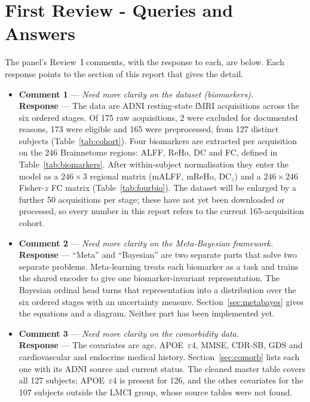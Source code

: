 \documentclass{ssnreview}
\begin{document}
\chapter{First Review - Queries and Answers}

The panel's Review~I comments, with the response to each, are below. Each response points
to the section of this report that gives the detail.

\begin{itemize}
  \item \textbf{Comment 1} --- \emph{Need more clarity on the dataset (biomarkers).}\\
        \textbf{Response} --- The data are ADNI resting-state fMRI acquisitions across the
        six ordered stages. Of 175 raw acquisitions, 2 were excluded for documented
        reasons, 173 were eligible and 165 were preprocessed, from 127 distinct subjects
        (Table~\ref{tab:cohort}). Four biomarkers are extracted per acquisition on the 246
        Brainnetome regions: ALFF, ReHo, DC and FC, defined in
        Table~\ref{tab:biomarkers}. After within-subject normalisation they enter the
        model as a $246\times3$ regional matrix (mALFF, mReHo, DC$_z$) and a
        $246\times246$ Fisher-$z$ FC matrix (Table~\ref{tab:fourbio}). The dataset will be
        enlarged by a further 50 acquisitions per stage; these have not yet been
        downloaded or processed, so every number in this report refers to the current
        165-acquisition cohort.
  \item \textbf{Comment 2} --- \emph{Need more clarity on the Meta-Bayesian framework.}\\
        \textbf{Response} --- ``Meta'' and ``Bayesian'' are two separate parts that solve
        two separate problems. Meta-learning treats each biomarker as a task and trains
        the shared encoder to give one biomarker-invariant representation. The Bayesian
        ordinal head turns that representation into a distribution over the six ordered
        stages with an uncertainty measure. Section~\ref{sec:metabayes} gives the
        equations and a diagram. Neither part has been implemented yet.
  \item \textbf{Comment 3} --- \emph{Need more clarity on the comorbidity data.}\\
        \textbf{Response} --- The covariates are age, APOE~$\varepsilon4$, MMSE, CDR-SB,
        GDS and cardiovascular and endocrine medical history. Section~\ref{sec:comorb}
        lists each one with its ADNI source and current status. The cleaned master table
        covers all 127 subjects; APOE~$\varepsilon4$ is present for 126, and the other covariates for the 107 subjects
        outside the LMCI group, whose source tables were not found.
\end{itemize}
\end{document}
